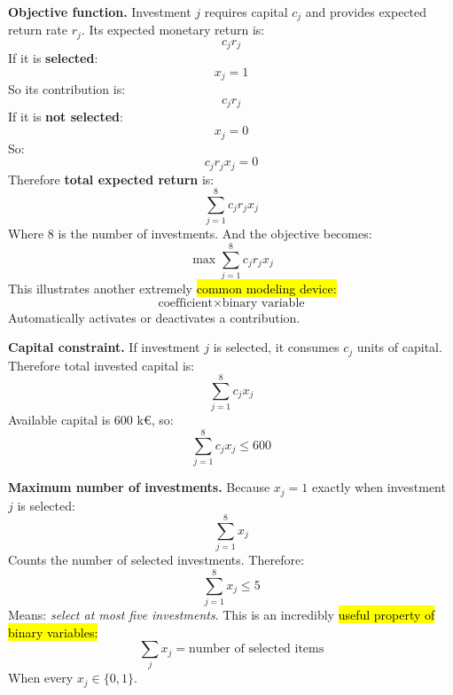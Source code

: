 \begin{examplebox}
    \highspace
    \textcolor{Green3}{ \textbf{Objective function.}} Investment $j$ requires capital $c_j$ and provides expected return rate $r_j$. Its expected monetary return is:
    \begin{equation*}
        c_jr_j
    \end{equation*}
    If it is \textbf{selected}:
    \begin{equation*}
        x_j=1
    \end{equation*}
    So its contribution is:
    \begin{equation*}
        c_jr_j
    \end{equation*}
    If it is \textbf{not selected}:
    \begin{equation*}
        x_j=0
    \end{equation*}
    So:
    \begin{equation*}
        c_jr_jx_j=0
    \end{equation*}
    Therefore \textbf{total expected return} is:
    \begin{equation*}
        \sum_{j=1}^{8}c_jr_jx_j
    \end{equation*}
    Where $8$ is the number of investments. And the objective becomes:
    \begin{equation*}
        \boxed{
            \max \sum_{j=1}^{8}c_jr_jx_j
        }
    \end{equation*}
    This illustrates another extremely \hl{common modeling device:}
    \begin{equation*}
        \text{coefficient}\times\text{binary variable}
    \end{equation*}
    Automatically activates or deactivates a contribution.

    \highspace
    \textcolor{Green3}{ \textbf{Capital constraint.}} If investment $j$ is selected, it consumes $c_j$ units of capital. Therefore total invested capital is:
    \begin{equation*}
        \sum_{j=1}^{8}c_jx_j
    \end{equation*}
    Available capital is $600$ k\euro, so:
    \begin{equation*}
        \boxed{
            \sum_{j=1}^{8}c_jx_j\leq600
        }
    \end{equation*}

    \highspace
    \textcolor{Green3}{ \textbf{Maximum number of investments.}} Because $x_j=1$ exactly when investment $j$ is selected:
    \begin{equation*}
        \sum_{j=1}^{8}x_j
    \end{equation*}
    Counts the number of selected investments. Therefore:
    \begin{equation*}
        \boxed{
            \sum_{j=1}^{8}x_j\leq5
        }
    \end{equation*}
    Means: \emph{select at most five investments}. This is an incredibly \hl{useful property of binary variables:}
    \begin{equation}
        \sum_jx_j=\text{number of selected items}
    \end{equation}
    When every $x_j\in\{0,1\}$.


\end{examplebox}
